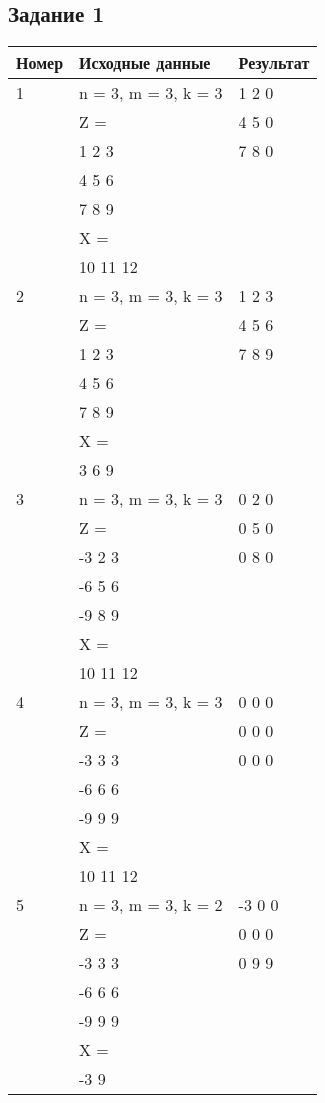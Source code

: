 \begin{minipage}[t]{0.5\textwidth}

\subsection*{\centering Задание 1}
\begin{tabular}{|l|l|l|}
    \hline
    Номер & Исходные данные & Результат\\[2ex]
    \hline
    1 & n = 3, m = 3, k = 3 & 1 2 0 \\
      & Z =                 & 4 5 0 \\
      & 1 2 3               & 7 8 0 \\
      & 4 5 6               & \\
      & 7 8 9               & \\
      & X =                 & \\
      & 10 11 12            & \\
    \hline
    2 & n = 3, m = 3, k = 3 & 1 2 3 \\
      & Z =                 & 4 5 6 \\
      & 1 2 3               & 7 8 9 \\
      & 4 5 6               & \\
      & 7 8 9               & \\
      & X =                 & \\
      & 3 6 9               & \\
    \hline
    3 & n = 3, m = 3, k = 3 & 0 2 0 \\
      & Z =                 & 0 5 0 \\
      & -3 2 3              & 0 8 0 \\
      & -6 5 6              & \\
      & -9 8 9              & \\
      & X =                 & \\
      & 10 11 12            & \\
    \hline
    4 & n = 3, m = 3, k = 3 & 0 0 0 \\
      & Z =                 & 0 0 0 \\
      & -3 3 3              & 0 0 0 \\
      & -6 6 6              & \\
      & -9 9 9              & \\
      & X =                 & \\
      & 10 11 12            & \\
    \hline
    5 & n = 3, m = 3, k = 2 & -3 0 0 \\
      & Z =                 & 0  0 0 \\
      & -3 3 3              & 0  9 9 \\
      & -6 6 6              & \\
      & -9 9 9              & \\
      & X =                 & \\
      & -3 9                & \\
    \hline
\end{tabular}

\end{minipage}%
